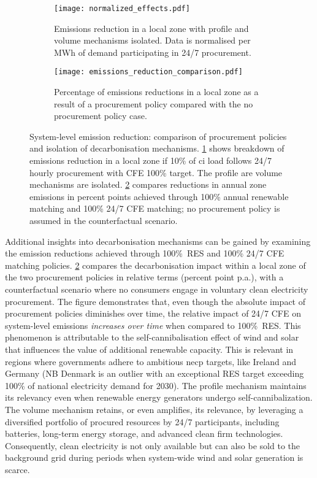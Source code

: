 \begin{figure}[H]
    \centering

    \begin{subfigure}[t]{\columnwidth}
        \centering
        \caption{Emissions reduction in a local zone with profile and volume mechanisms isolated. Data is normalised per MWh of demand participating in 24/7 procurement.}
        \texttt{[image: normalized\_effects.pdf]}
        \label{fig:10-profile-volume.pdf}
    \end{subfigure}

    \begin{subfigure}[t]{\columnwidth}
        \centering
        \caption{Percentage of emissions reductions in a local zone as a result of a procurement policy compared with the no procurement policy case.}
        \texttt{[image: emissions\_reduction\_comparison.pdf]}
        \label{fig:10-hourly-annual.pdf}
    \end{subfigure}

    \caption{
        System-level emission reduction: comparison of procurement policies and isolation of decarbonisation mechanisms.
        \cref{fig:10-profile-volume.pdf} shows breakdown of emissions reduction in a local zone if 10\% of \gls{ci} load follows 24/7 hourly procurement with CFE 100\% target. The profile are volume mechanisms are isolated.
        \cref{fig:10-hourly-annual.pdf} compares reductions in annual zone emissions in percent points achieved through 100\% annual renewable matching and 100\% 24/7 CFE matching; no procurement policy is assumed in the counterfactual scenario.}
        \label{fig:decarbonisation_story}

\end{figure}


Additional insights into decarbonisation mechanisms can be gained by examining the emission reductions achieved through 100\%~RES and 100\% 24/7 CFE matching policies.
\cref{fig:10-hourly-annual.pdf} compares the decarbonisation impact within a local zone of the two procurement policies in relative terms (percent point p.a.), with a counterfactual scenario where no consumers engage in voluntary clean electricity procurement.
The figure demonstrates that, even though the absolute impact of procurement policies diminishes over time, the relative impact of 24/7 CFE on system-level emissions \textit{increases over time} when compared to 100\%~RES.
This phenomenon is attributable to the self-cannibalisation effect of wind and solar that influences the value of additional renewable capacity.
This is relevant in regions where governments adhere to ambitious \gls{necp} targets, like Ireland and Germany (NB Denmark is an outlier with an exceptional RES target exceeding 100\% of national electricity demand for 2030).
The profile mechanism maintains its relevancy even when renewable energy generators undergo self-cannibalization.
The volume mechanism retains, or even amplifies, its relevance, by leveraging a diversified portfolio of procured resources by 24/7 participants, including batteries, long-term energy storage, and advanced clean firm technologies.
Consequently, clean electricity is not only available but can also be sold to the background grid during periods when system-wide wind and solar generation is scarce.
